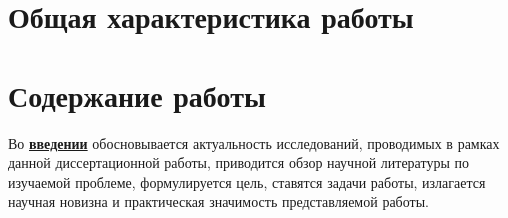 \newcommand{\ifext}[2]{\ifdefined\extflag{#1}\else{#2}\fi}
\newcommand{\tick}{\checkmark}%
\newcommand{\tickP}{\checkmark}%
\newcommand{\tickPP}{\checkmark}%
\newcommand{\xmark}{\text{\ding{55}}}
\newcommand{\fail}{\xmark}%

\section*{Общая характеристика работы}

\newcommand{\actuality}{\underline{\textbf{\actualityTXT}}}
\newcommand{\progress}{\underline{\textbf{\progressTXT}}}
\newcommand{\aim}{\underline{{\textbf\aimTXT}}}
\newcommand{\tasks}{\underline{\textbf{\tasksTXT}}}
\newcommand{\novelty}{\underline{\textbf{\noveltyTXT}}}
\newcommand{\influence}{\underline{\textbf{\influenceTXT}}}
\newcommand{\methods}{\underline{\textbf{\methodsTXT}}}
\newcommand{\defpositions}{\underline{\textbf{\defpositionsTXT}}}
\newcommand{\reliability}{\underline{\textbf{\reliabilityTXT}}}
\newcommand{\probation}{\underline{\textbf{\probationTXT}}}
\newcommand{\contribution}{\underline{\textbf{\contributionTXT}}}
\newcommand{\publications}{\underline{\textbf{\publicationsTXT}}}




\section*{Содержание работы}
Во \underline{\textbf{введении}} обосновывается актуальность
исследований, проводимых в рамках данной диссертационной работы,
приводится обзор научной литературы по изучаемой проблеме,
формулируется цель, ставятся задачи работы, излагается научная новизна
и практическая значимость представляемой работы.

